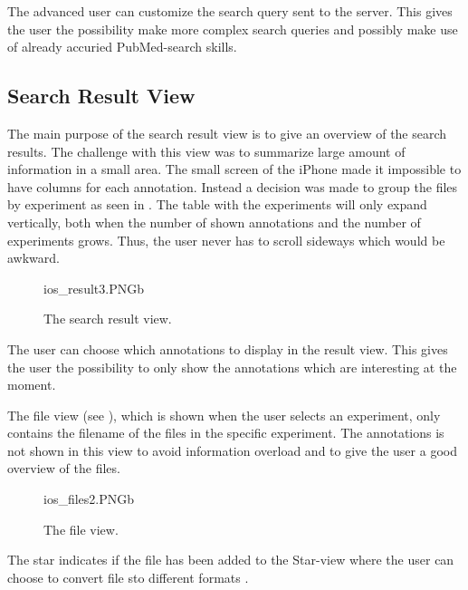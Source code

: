 The advanced user can customize the search query sent to the server. This gives the user the possibility make more complex search queries and possibly make use of already accuried PubMed-search skills.

\subsection{Search Result View}
The main purpose of the search result view is to give an overview of the search results. The challenge with this view was to summarize large amount of information in a small area. The small screen of the iPhone made it impossible to have columns for each annotation. Instead a decision was made to group the files by experiment as seen in . The table with the experiments will only expand vertically, both when the number of shown annotations and the number of experiments grows. Thus, the user never has to scroll sideways which would be awkward.

\begin{figure}[ht]
		{ios_result3.PNG}{b}
\caption{The search result view.}
\label{fig:ios_searchResult2}
\end{figure}
\FloatBarrier

The user can choose which annotations to display in the result view. This gives the user the possibility to only show the annotations which are interesting at the moment. 

The file view (see ), which is shown when the user selects an experiment, only contains the filename of the files in the specific experiment. The annotations is not shown in this view to avoid information overload and to give the user a good overview of the files.

\begin{figure}[ht]
		{ios_files2.PNG}{b}
\caption{The file view.}
\label{fig:ios_files2}
\end{figure}
\FloatBarrier

The star indicates if the file has been added to the Star-view where the user can choose to convert file sto different formats .


